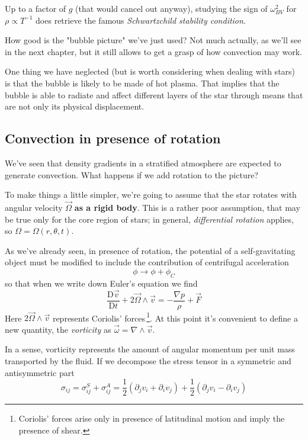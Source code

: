 \par Up to a factor of $g$ (that would cancel out anyway), studying the sign of $\omega^{2}_{BV}$ for $\rho \propto T^{-1}$ does retrieve the famous \emph{Schwartzchild stability condition}.
\par How good is the "bubble picture" we've just used? Not much actually, as we'll see in the next chapter, but it still allows to get a grasp of how convection may work.
\par One thing we have neglected (but is worth considering when dealing with stars) is that the bubble is likely to be made of hot plasma. That implies that the bubble is able to radiate and affect different layers of the star through means that are not only its physical displacement.
\subsection{Convection in presence of rotation}
We've seen that density gradients in a stratified atmosphere are expected to generate convection. What happens if we add rotation to the picture?
\par To make things a little simpler, we're going to assume that the star rotates with angular velocity $\vec{\Omega}$ \textbf{as a rigid body}. This is a rather poor assumption, that may be true only for the core region of stars; in general, \emph{differential rotation} applies, so $\Omega = \Omega(r,\theta,t)$.

As we've already seen, in presence of rotation, the potential of a self-gravitating object must be modified to include the contribution of centrifugal acceleration 
\begin{equation*}
    \phi \to \phi+\phi_{C}
\end{equation*}
so that when we write down Euler's equation we find 
\begin{equation}
    \frac{\text{D}\vec{v}}{\text{D}t} +2\vec{\Omega} \wedge \vec{v} = -\frac{\nabla p}{\rho}+\vec{F}
\end{equation}
Here $2\vec{\Omega} \wedge \vec{v}$ represents Coriolis' forces\,\footnote{Coriolis' forces arise only in presence of latitudinal motion and imply the presence of shear.}. At this point it's convenient to define a new quantity, the \emph{vorticity} as $ \vec{\omega} = \nabla \wedge \vec{v}$.
\par In a sense, vorticity represents the amount of angular momentum per unit mass transported by the fluid. If we decompose the stress tensor in a symmetric and antisymmetric part
\begin{equation*}
    \sigma_{ij} = \sigma_{ij}^{S}+\sigma_{ij}^{A} = \frac{1}{2}(\partial_{j}v_{i}+\partial_{i}v_{j}) + \frac{1}{2}(\partial_{j}v_{i}-\partial_{i}v_{j})
\end{equation*}

